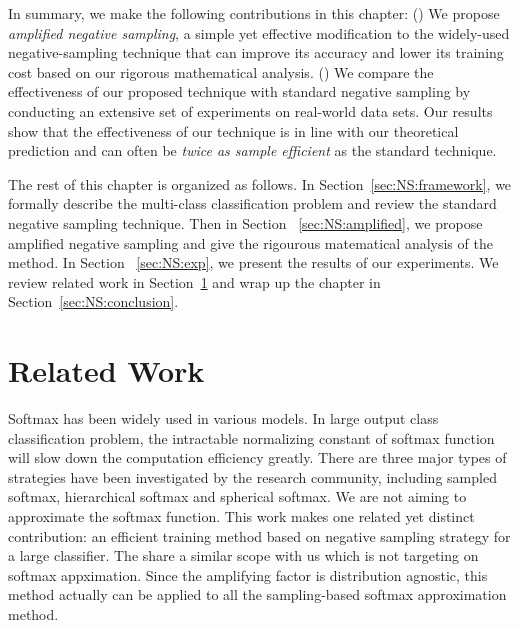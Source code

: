 In summary, we make the following contributions in this chapter:
() We propose \emph{amplified negative sampling}, a simple yet effective modification to the widely-used negative-sampling technique that can improve its accuracy and lower its training cost based on our rigorous mathematical analysis.
 () We compare the effectiveness of our proposed technique with standard negative sampling by conducting an extensive set of experiments on real-world data sets. Our results show that the effectiveness of our technique is in line with our theoretical prediction and can often be \emph{twice as sample efficient} as the standard technique. 


The rest of this chapter is organized as follows. In Section~\ref{sec:NS:framework}, 
we formally describe the multi-class classification problem and review the standard negative sampling technique. Then in Section ~\ref{sec:NS:amplified}, 
we propose amplified negative sampling and give the rigourous matematical analysis of the method. In Section ~\ref{sec:NS:exp}, 
we present the results of our experiments. We review related work in Section~\ref{sec:NS:related} 
and wrap up the chapter in Section~\ref{sec:NS:conclusion}.

\section{Related Work}
\label{sec:NS:related}
Softmax has been widely used in various models. In large output class classification problem, the intractable normalizing constant of softmax function will slow down the computation efficiency greatly. There are three major types of strategies have been investigated by the research community, including sampled softmax\citep{bengio2008adaptive}, hierarchical softmax\citep{morin2005hierarchical} and spherical softmax\citep{vincent2015efficient}.
We are not aiming to approximate the softmax function. This work makes one related yet distinct contribution: an efficient training method based on negative sampling strategy for a large classifier.  The \citep{ruiz2018augment} share a similar scope with us which is not targeting on softmax appximation. Since the amplifying factor is distribution agnostic, this method actually can be applied to all the sampling-based softmax approximation method\citep{blanc2017adaptive,rawat2019sampled}.

